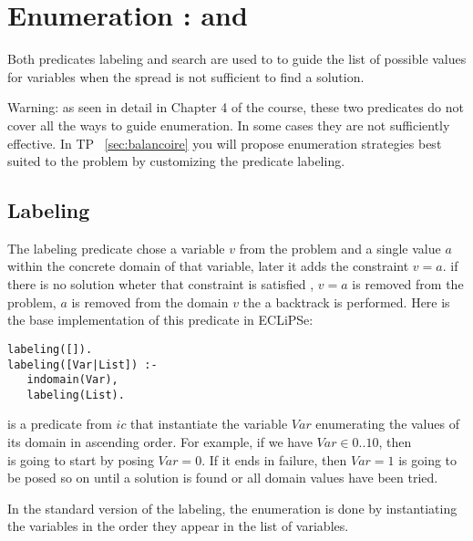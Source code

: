 
\section{Enumeration :   and }
\label{intro:labeling}

Both predicates labeling and search are used to
to guide the list of possible values for variables
when the spread is not sufficient to find a solution.

Warning: as seen in detail in Chapter 4 of the course, these two
predicates do not cover all the ways to guide
enumeration. In some cases they are not sufficiently
effective. In TP ~\ref{sec:balancoire} you will propose
enumeration strategies best suited to the problem by customizing the
predicate labeling.


\subsection{Labeling}
The labeling predicate chose a variable  $v$ from the problem and a single value $a$ within the concrete domain of that variable, later it adds the constraint $v = a$. if there is no solution wheter that constraint is satisfied , $v = a$ is removed from the problem, $a$ is removed from the domain $v$ the a backtrack is performed. Here is the base implementation of this predicate in ECLiPSe:

\begin{verbatim}
labeling([]).
labeling([Var|List]) :- 
   indomain(Var),
   labeling(List).
\end{verbatim}

 is a predicate from $ic$ that instantiate the variable $Var$ enumerating the values of its domain in ascending order.
For example, if we have $Var \in 0 .. 10$, then \\
is going to start by posing $Var = 0$. If it ends in failure, then $Var = 1$ is going to be posed so on until a solution is found or all domain values have been tried.

In the standard version of the labeling, the enumeration is done by instantiating the variables in the order they appear in the list of variables.


